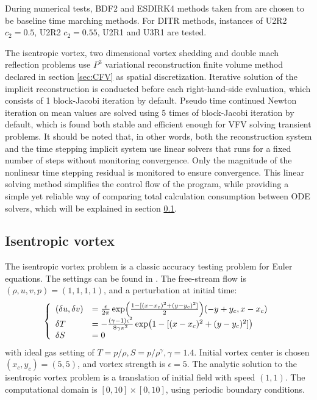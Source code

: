 \documentclass[preprint,12pt]{elsarticle}
\begin{document}
During numerical tests,
BDF2 and ESDIRK4 methods taken from
\cite{bijl2002implicitBDFvESDIRK,kennedy2003additiveARK}
are chosen to be
baseline time marching methods.
For DITR methods, instances of
U2R2 $c_2 = 0.5$, U2R2 $c_2 = 0.55$, U2R1 and U3R1 are tested.

The isentropic vortex, two dimensional vortex shedding
and  double mach reflection problems use
$P^3$ variational reconstruction finite volume method declared in
section \ref{sec:CFV} as spatial  discretization.
Iterative solution of the implicit reconstruction
is conducted before each right-hand-side evaluation,
which consists of 1 block-Jacobi iteration by default.
Pseudo time continued Newton iteration on mean values are
solved using 5 times of block-Jacobi iteration by default,
which is found both stable and efficient enough for VFV solving
transient problems.
It should be noted that, in other words,
both the reconstruction system and
the time stepping implicit system use linear solvers that
runs for a fixed number of steps without monitoring convergence.
Only the magnitude of the nonlinear time stepping residual
is monitored to ensure convergence.
This linear solving method simplifies the control flow of
the program,
while providing a simple yet reliable way of
comparing total calculation consumption between ODE solvers,
which will be explained in section \ref{ssec:resultIV}.



\subsection{Isentropic vortex}
\label{ssec:resultIV}

The isentropic vortex problem is a classic
accuracy testing problem for Euler equations.
The settings can be found in \cite{hu1999weighted_WENO}.
The free-stream flow is $(\rho,u,v,p)=(1,1,1,1)$,
and a perturbation at initial time:
\begin{equation}
    \left\{
    \begin{array}[2]{ll}
        (\delta u, \delta v) & = \frac{\epsilon}{2\pi}\exp(\frac{1-[(x-x_c)^2+(y-y_c)^2]}{2})(-y+y_c,x-x_c) \\
        \delta T             & = - \frac{(\gamma-1)\epsilon^2}{8\gamma\pi^2}\exp(1-[(x-x_c)^2+(y-y_c)^2])   \\
        \delta S             & = 0                                                                          \\
    \end{array}
    \right.
\end{equation}
with ideal gas setting of $T = p/\rho, S= p/\rho^\gamma, \gamma =1.4$.
Initial vortex center is chosen $(x_c,y_c)=(5,5)$,
and vortex strength is $\epsilon = 5$.
The analytic solution to the isentropic vortex problem is a
translation of initial field with speed $(1,1)$.
The computational domain is $[0,10]\times[0,10]$,
using periodic boundary conditions.
\end{document}

